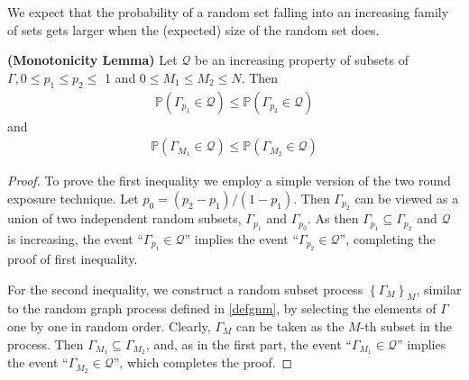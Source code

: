 \documentclass{article}
\newcommand{\bfs}[1]{\textbf{({#1}) }}
\begin{document}
We expect that the probability of a random set falling into an increasing family of sets gets larger when the (expected) size of the random set does. 
\begin{lema}{\bfs{Monotonicity Lemma}}\label{lema:mono}
Let $\mathcal{Q}$ be an increasing property of subsets of $\Gamma, 0 \leq p_{1} \leq p_{2} \leq$ 1 and $0 \leq M_{1} \leq M_{2} \leq N .$ Then
\begin{align*}
\mathbb{P}\left(\Gamma_{p_{1}} \in \mathcal{Q}\right) \leq \mathbb{P}\left(\Gamma_{p_{2}} \in \mathcal{Q}\right)
\end{align*}
and
\begin{align*}
\mathbb{P}\left(\Gamma_{M_{1}} \in \mathcal{Q}\right) \leq \mathbb{P}\left(\Gamma_{M_{2}} \in \mathcal{Q}\right)
\end{align*}
\end{lema}
\begin{proof}
To prove the first inequality we employ a simple version of the two round exposure technique. Let $p_{0}=\left(p_{2}-p_{1}\right) /\left(1-p_{1}\right) .$ Then $\Gamma_{p_{2}}$ can be viewed as a union of two independent random subsets, $\Gamma_{p_{1}}$ and $\Gamma_{p_{0}}$. As then $\Gamma_{p_{1}} \subseteq \Gamma_{p_{2}}$ and $\mathcal{Q}$ is increasing, the event ``$\Gamma_{p_{1}} \in \mathcal{Q}$'' implies the event ``$\Gamma_{p_{2}} \in \mathcal{Q}$'', completing the proof of first inequality.

For the second inequality, we construct a random subset process $\left\{\Gamma_{M}\right\}_{M}$, similar to the random graph process defined in \cref{defgnm}, by selecting the elements of $\Gamma$ one by one in random order. Clearly, $\Gamma_{M}$ can be taken as the $M$-th subset in the process. Then $\Gamma_{M_{1}} \subseteq \Gamma_{M_{2}}$, and, as in the first part, the event ``$ \Gamma_{M_{1}} \in \mathcal{Q}$'' implies the event ``$\Gamma_{M_{2}} \in \mathcal{Q}$'', which completes the proof.
\end{proof} 
\end{document}
